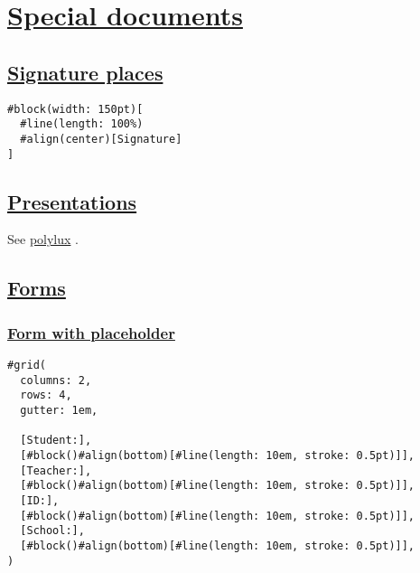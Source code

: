 \section{\texorpdfstring{\hyperref[special-documents]{Special
documents}}{Special documents}}\label{special-documents}

\subsection{\texorpdfstring{\hyperref[signature-places]{Signature
places}}{Signature places}}\label{signature-places}

\begin{verbatim}
#block(width: 150pt)[
  #line(length: 100%)
  #align(center)[Signature]
]
\end{verbatim}

\pandocbounded{}

\subsection{\texorpdfstring{\hyperref[presentations]{Presentations}}{Presentations}}\label{presentations}

See \href{../../packages/}{polylux} .

\subsection{\texorpdfstring{\hyperref[forms]{Forms}}{Forms}}\label{forms}

\subsubsection{\texorpdfstring{\hyperref[form-with-placeholder]{Form
with placeholder}}{Form with placeholder}}\label{form-with-placeholder}

\begin{verbatim}
#grid(
  columns: 2,
  rows: 4,
  gutter: 1em,

  [Student:],
  [#block()#align(bottom)[#line(length: 10em, stroke: 0.5pt)]],
  [Teacher:],
  [#block()#align(bottom)[#line(length: 10em, stroke: 0.5pt)]],
  [ID:],
  [#block()#align(bottom)[#line(length: 10em, stroke: 0.5pt)]],
  [School:],
  [#block()#align(bottom)[#line(length: 10em, stroke: 0.5pt)]],
)
\end{verbatim}

\pandocbounded{}

